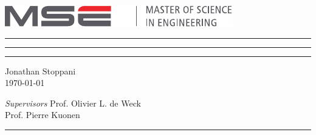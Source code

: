 \begin{titlepage}
\thispagestyle{empty}

\vspace*{10mm}
\includegraphics{images/logo_mse}
\vspace{5mm}

\newsavebox{\maintitle}
\savebox{\maintitle}{\Huge \doctitle}

\newlength{\titlew}
\settowidth{\titlew}{\usebox{\maintitle}}


\hrule
\vspace{0.2mm}
\usebox\maintitle
\vspace{4mm}
\hrule
\begin{minipage}[t]{\titlew}
\end{minipage}
\vspace{100mm}

\hrule
\vspace{-1mm}
\begin{minipage}[t]{0.5\textwidth}
    \begin{flushleft}
        Jonathan Stoppani\\[1.5mm]
        \today
    \end{flushleft}
\end{minipage}%
\begin{minipage}[t]{0.5\textwidth}
	\begin{flushright}
	  \emph{Supervisors}\hspace{2.5mm} Prof. Olivier L. de Weck\\[1.5mm]
	  Prof. Pierre Kuonen
    \end{flushright}
\end{minipage}
\vspace{3.5mm}
\hrule


\end{titlepage}
